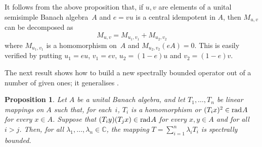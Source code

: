 \documentclass[a4paper,12pt,reqno]{amsart}
\numberwithin{equation}{section}
\newtheorem{prop}[thm]{Proposition}
\theoremstyle{definition}
\begin{document}
It follows from the above proposition that, if $u,v$ are elements of a unital semisimple Banach algebra~$A$ and $e=vu$ is a central
idempotent in $A$, then $M_{u,v}$ can be decomposed as
\[
M_{u,v}=M_{u_1,v_1}+M_{u_2,v_2}
\]
where $M_{u_1,v_1}$ is a homomorphism on~$A$ and $M_{u_2,v_2}(eA)=0$. This is easily verified by putting
$u_1=eu$, $v_1=ev$, $u_2=(1-e)u$ and $v_2=(1-e)v$.

The next result shows how to build a new spectrally bounded operator out of a number of given ones;
it generalises \cite[Lemma~2.1]{NaMa11}.
\begin{prop}\label{prop:spb-hom}
Let\/ $A$ be a  unital Banach algebra, and let\/ $T_1,\ldots, T_n$  be linear mappings on $A$ such that, for each~$i$,
$T_i$ is a homomorphism or $(T_i x)^2 \in{{\textup{rad}\kern.7pt A}}$ for every $x\in A$.
Suppose that $(T_i y) (T_jx)\in{{\textup{rad}\kern.7pt A}}$ for every $x, y\in A$ and for all $i>j$.
Then, for all\/ $\lambda_1, \ldots,  \lambda_n \in{\mathbb{C}}$, the mapping\/ $T=\sum_{i=1}^n \lambda_i T_i$ is spectrally bounded.
\end{prop}
\end{document}

